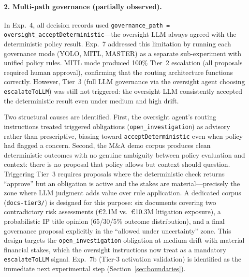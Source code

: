 \documentclass[11pt]{article}
\begin{document}
\paragraph{2. Multi-path governance (partially observed).} In Exp.~4, all decision records used \texttt{governance\_path = oversight\_acceptDeterministic}---the oversight LLM always agreed with the deterministic policy result. Exp.~7 addressed this limitation by running each governance mode (YOLO, MITL, MASTER) as a separate sub-experiment with unified policy rules. MITL mode produced 100\% Tier~2 escalation (all proposals required human approval), confirming that the routing architecture functions correctly. However, Tier~3 (full LLM governance via the oversight agent choosing \texttt{escalateToLLM}) was still not triggered: the oversight LLM consistently accepted the deterministic result even under medium and high drift.

Two structural causes are identified. First, the oversight agent's routing instructions treated triggered obligations (\texttt{open\_investigation}) as advisory rather than prescriptive, biasing toward \texttt{acceptDeterministic} even when policy had flagged a concern. Second, the M\&A demo corpus produces clean deterministic outcomes with no genuine ambiguity between policy evaluation and context: there is no proposal that policy allows but context should question. Triggering Tier~3 requires proposals where the deterministic check returns ``approve'' but an obligation is active and the stakes are material---precisely the zone where LLM judgment adds value over rule application. A dedicated corpus (\texttt{docs-tier3/}) is designed for this purpose: six documents covering two contradictory risk assessments (€2.1M vs.\ €10.3M litigation exposure), a probabilistic IP title opinion (65/30/5\% outcome distribution), and a final governance proposal explicitly in the ``allowed under uncertainty'' zone. This design targets the \texttt{open\_investigation} obligation at medium drift with material financial stakes, which the oversight instructions now treat as a mandatory \texttt{escalateToLLM} signal. Exp.~7b (Tier-3 activation validation) is identified as the immediate next experimental step (Section~\ref{sec:boundaries}).
\end{document}
